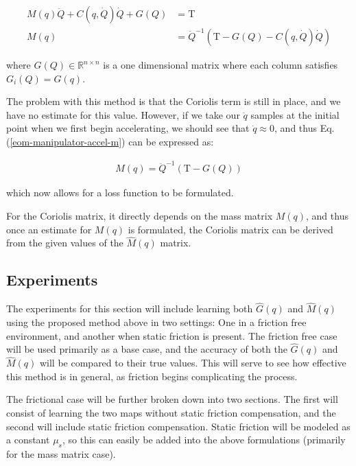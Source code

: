\begin{align}
  \label{eom-manipulator-accel}
  M(q)\ddot{Q} + C(q,\dot{Q})\dot{Q} + G(Q) &= \mathrm{T}\\
  \label{eom-manipulator-accel-m}
  M(q) &= \ddot{Q}^{-1}(\mathrm{T} - G(Q) - C(q,\dot{Q})\dot{Q})
\end{align}

\noindent where $G(Q)\in\mathbb{R}^{n\times n}$ is a one dimensional matrix
where each column satisfies $G_{i}(Q) = G(q)$.

The problem with this method is that the Coriolis term is still in place, and we
have no estimate for this value.
However, if we take our $\ddot{q}$ samples at the initial point when we first
begin accelerating, we should see that $\dot{q} \approx 0$, and thus Eq.
(\ref{eom-manipulator-accel-m}) can be expressed as:

\begin{align}
  M(q) = \ddot{Q}^{-1}(\mathrm{T} - G(Q))
\end{align}

\noindent which now allows for a loss function to be formulated.

For the Coriolis matrix, it directly depends on the mass matrix $M(q)$, and thus
once an estimate for $M(q)$ is formulated, the Coriolis matrix can be derived
from the given values of the $\hat{M}(q)$ matrix.

\subsection{Experiments}
The experiments for this section will include learning both $\hat{G}(q)$ and
$\hat{M}(q)$ using the proposed method above in two settings: One in a friction
free environment, and another when static friction is present.
The friction free case will be used primarily as a base case, and the accuracy
of both the $\hat{G}(q)$ and $\hat{M}(q)$ will be compared to their true values.
This will serve to see how effective this method is in general, as
friction begins complicating the process.

The frictional case will be further broken down into two sections.
The first will consist of learning the two maps without static friction
compensation, and the second will include static friction compensation.
Static friction will be modeled as a constant $\mu_{s}$, so this can easily be
added into the above formulations (primarily for the mass matrix case).
